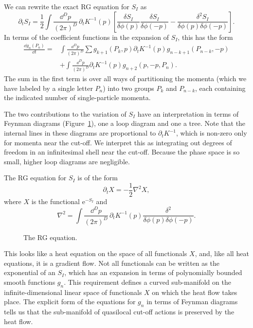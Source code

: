 We can rewrite the exact RG equation for $S_I$ as
\[
  \partial_tS_I=\frac12\int\frac{\dd^D p}{(2\pi)^D}\,
  \partial_tK^{-1}(p)\left[
  \frac{\delta S_I}{\delta\phi(p)}\frac{\delta S_I}{\delta\phi(-p)}
  -\frac{\delta^2S_I}{\delta\phi(p)\delta\phi(-p)}\right].
\]
In terms of the coefficient functions in the expansion of $S_I$, this has
the form
\[
\begin{aligned}
  \frac{\dd g_n(P_n)}{\dd t}
  ={}&\int\frac{\dd^D p}{(2\pi)^D}\sum
  g_{k+1}(P_k,p)\partial_tK^{-1}(p)
  g_{n-k+1}(P_{n-k},-p)\\
  &+\int\frac{\dd^D p}{(2\pi)^D}\partial_tK^{-1}(p)
  g_{n+2}(p,-p,P_n) .
\end{aligned}
\]
The sum in the first term is over all ways of partitioning the momenta (which
we have labeled by a single letter $P_n$) into two groups $P_k$ and
$P_{n-k}$, each containing the indicated number of single-particle momenta.

The two contributions to the variation of $S_I$ have an interpretation in
terms of Feynman diagrams (Figure~\ref{fig:9.2}), one a loop diagram and one a
tree. Note that the internal lines in these diagrams are proportional to
$\partial_tK^{-1}$, which is non-zero only for momenta near the cut-off. We
interpret this as integrating out degrees of freedom in an infinitesimal shell
near the cut-off. Because the phase space is so small, higher loop diagrams are
negligible.

The RG equation for $S_I$ is of the form
\[
  \partial_tX=-\frac12\nabla^2X,
\]
where $X$ is the functional $\mathrm{e}^{-S_I}$ and
\[
  \nabla^2=\int\frac{\dd^D p}{(2\pi)^D}\,
  \partial_tK^{-1}(p)\frac{\delta^2}
  {\delta\phi(p)\delta\phi(-p)} .
\]

\begin{figure}[htbp]
  \centering
  
  \caption{The RG equation.}
  \label{fig:9.2}
\end{figure}

This looks like a heat equation on the space of all functionals $X$, and, like
all heat equations, it is a gradient flow. Not all functionals can be written
as the exponential of an $S_I$, which has an expansion in terms of polynomially
bounded smooth functions $g_n$. This requirement defines a curved sub-manifold
on the infinite-dimensional linear space of functionals $X$ on which the heat
flow takes place. The explicit form of the equations for $g_n$ in terms of
Feynman diagrams tells us that the sub-manifold of quasilocal cut-off actions
is preserved by the heat flow.

